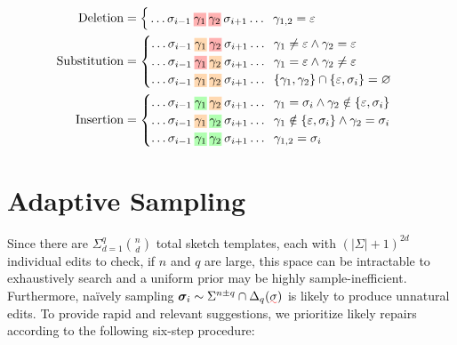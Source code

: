 \documentclass[sigplan,nonacm]{acmart}\settopmatter{printfolios=false,printccs=false,printacmref=false}
\begin{document}
\begin{align*}
  \text{Deletion}&=\begin{cases}
    \,\ldots\sigma_{i-1}\:\text{\hlred{$\gamma_1$}\:\hlred{$\gamma_2$}}\:\sigma_{i+1}\ldots\hspace{0.2cm}\gamma_{1, 2} = \varepsilon\label{eq:del}
  \end{cases}\\
  \text{Substitution}&=\begin{cases}
    \ldots\sigma_{i-1}\:\text{\hlorange{$\gamma_1$}\:\hlred{$\gamma_2$}}\:\sigma_{i+1}\ldots\hspace{0.2cm}\gamma_1 \neq \varepsilon \land \gamma_2 = \varepsilon\\
    \ldots\sigma_{i-1}\:\text{\hlred{$\gamma_1$}\:\hlorange{$\gamma_2$}}\:\sigma_{i+1}\ldots\hspace{0.2cm}\gamma_1 = \varepsilon \land \gamma_2 \neq \varepsilon\\
    \ldots\sigma_{i-1}\:\text{\hlorange{$\gamma_1$}\:\hlorange{$\gamma_2$}}\:\sigma_{i+1}\ldots\hspace{0.2cm}\{\gamma_1, \gamma_2\}\cap\{\varepsilon, \sigma_i\} = \varnothing
  \end{cases}\\
  \text{Insertion}&=\begin{cases}
    \ldots\sigma_{i-1}\:\text{\hlgreen{$\gamma_1$}\:\hlorange{$\gamma_2$}}\:\sigma_{i+1}\ldots\hspace{0.2cm}\gamma_1 = \sigma_i \land \gamma_2 \notin \{\varepsilon,  \sigma_i\}\label{eq:ins2}\\
    \ldots\sigma_{i-1}\:\text{\hlorange{$\gamma_1$}\:\hlgreen{$\gamma_2$}}\:\sigma_{i+1}\ldots\hspace{0.2cm}\gamma_1 \notin \{\varepsilon, \sigma_i\} \land \gamma_2 = \sigma_i\label{eq:ins1}\\
    \ldots\sigma_{i-1}\:\text{\hlgreen{$\gamma_1$}\:\hlgreen{$\gamma_2$}}\:\sigma_{i+1}\ldots\hspace{0.2cm}\gamma_{1,2} = \sigma_i\label{eq:copy}
  \end{cases}
\end{align*}

\section{Adaptive Sampling}\label{sec:holes}

Since there are $\Sigma_{d=1}^q{n \choose d}$ total sketch templates, each with $(|\Sigma| + 1)^{2d}$ individual edits to check, if $n$ and $q$ are large, this space can be intractable to exhaustively search and a uniform prior may be highly sample-inefficient. Furthermore, na\"ively sampling $\bm{\sigma}_i\sim\Sigma^{n\pm q}\cap\Delta_{q}(\err{\sigma})$ is likely to produce unnatural edits. To provide rapid and relevant suggestions, we prioritize likely repairs according to the following six-step procedure:
\end{document}
